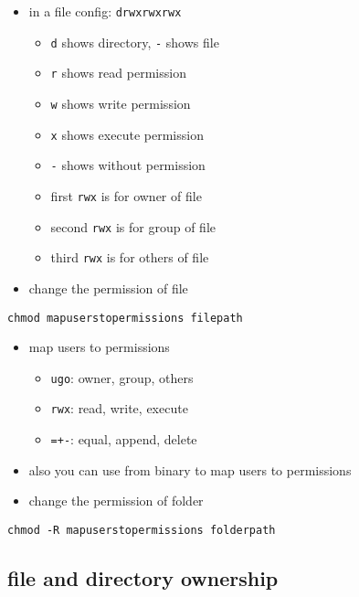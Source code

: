 \documentclass[
]{article}
\providecommand{\tightlist}{%
  \setlength{\itemsep}{0pt}\setlength{\parskip}{0pt}}
\begin{document}
\begin{itemize}
\tightlist
\item
  in a file config: \texttt{drwxrwxrwx}

  \begin{itemize}
  \tightlist
  \item
    \texttt{d} shows directory, \texttt{-} shows file
  \item
    \texttt{r} shows read permission
  \item
    \texttt{w} shows write permission
  \item
    \texttt{x} shows execute permission
  \item
    \texttt{-} shows without permission
  \item
    first \texttt{rwx} is for owner of file
  \item
    second \texttt{rwx} is for group of file
  \item
    third \texttt{rwx} is for others of file
  \end{itemize}
\item
  change the permission of file
\end{itemize}

\begin{verbatim}
chmod mapuserstopermissions filepath
\end{verbatim}

\begin{itemize}
\item
  map users to permissions

  \begin{itemize}
  \tightlist
  \item
    \texttt{ugo}: owner, group, others
  \item
    \texttt{rwx}: read, write, execute
  \item
    \texttt{=+-}: equal, append, delete
  \end{itemize}
\item
  also you can use from binary to map users to permissions
\item
  change the permission of folder
\end{itemize}

\begin{verbatim}
chmod -R mapuserstopermissions folderpath
\end{verbatim}

\hypertarget{file-and-directory-ownership}{%
\subsection{file and directory
ownership}\label{file-and-directory-ownership}}
\end{document}
